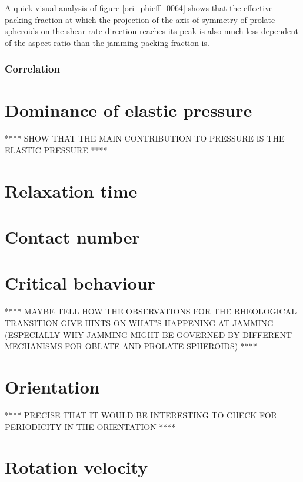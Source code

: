 \documentclass[class=report, float=false, crop=false]{standalone}
\begin{document}
A quick visual analysis of figure \ref{ori_phieff_0064} shows that the effective packing fraction at which the projection of the axis of symmetry of prolate spheroids on the shear rate direction reaches its peak is also much less dependent of the aspect ratio than the jamming packing fraction is.


\subsubsection{Correlation}

\section{Dominance of elastic pressure}

**** SHOW THAT THE MAIN CONTRIBUTION TO PRESSURE IS THE ELASTIC PRESSURE ****

\section{Relaxation time}

\section{Contact number}

\section{Critical behaviour}

**** MAYBE TELL HOW THE OBSERVATIONS FOR THE RHEOLOGICAL TRANSITION GIVE HINTS ON WHAT'S HAPPENING AT JAMMING (ESPECIALLY WHY JAMMING MIGHT BE GOVERNED BY DIFFERENT MECHANISMS FOR OBLATE AND PROLATE SPHEROIDS) ****

\section{Orientation}

**** PRECISE THAT IT WOULD BE INTERESTING TO CHECK FOR PERIODICITY IN THE ORIENTATION ****

\section{Rotation velocity}

% 
\end{document}
